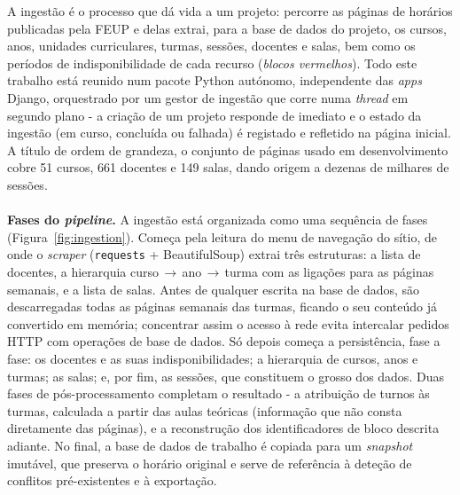 \documentclass[10pt]{article}
\begin{document}
    A ingestão é o processo que dá vida a um projeto: percorre as páginas de horários publicadas pela FEUP e delas extrai, para a base de dados do projeto, os cursos, anos, unidades curriculares, turmas, sessões, docentes e salas, bem como os períodos de indisponibilidade de cada recurso (\emph{blocos vermelhos}). Todo este trabalho está reunido num pacote Python autónomo, independente das \emph{apps} Django, orquestrado por um gestor de ingestão que corre numa \emph{thread} em segundo plano - a criação de um projeto responde de imediato e o estado da ingestão (em curso, concluída ou falhada) é registado e refletido na página inicial. A título de ordem de grandeza, o conjunto de páginas usado em desenvolvimento cobre 51 cursos, 661 docentes e 149 salas, dando origem a dezenas de milhares de sessões.
    \\\\
    \textbf{Fases do \emph{pipeline}.} A ingestão está organizada como uma sequência de fases (Figura~\ref{fig:ingestion}). Começa pela leitura do menu de navegação do sítio, de onde o \emph{scraper} (\texttt{requests} + BeautifulSoup) extrai três estruturas: a lista de docentes, a hierarquia curso\,$\rightarrow$\,ano\,$\rightarrow$\,turma com as ligações para as páginas semanais, e a lista de salas. Antes de qualquer escrita na base de dados, são descarregadas todas as páginas semanais das turmas, ficando o seu conteúdo já convertido em memória; concentrar assim o acesso à rede evita intercalar pedidos HTTP com operações de base de dados. Só depois começa a persistência, fase a fase: os docentes e as suas indisponibilidades; a hierarquia de cursos, anos e turmas; as salas; e, por fim, as sessões, que constituem o grosso dos dados. Duas fases de pós-processamento completam o resultado - a atribuição de turnos às turmas, calculada a partir das aulas teóricas (informação que não consta diretamente das páginas), e a reconstrução dos identificadores de bloco descrita adiante. No final, a base de dados de trabalho é copiada para um \emph{snapshot} imutável, que preserva o horário original e serve de referência à deteção de conflitos pré-existentes e à exportação.
\end{document}
